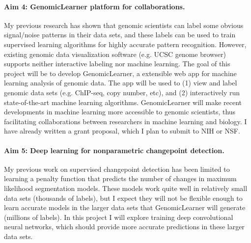 \documentclass{article}
\begin{document}
\paragraph{Aim 4: GenomicLearner platform for collaborations.} My
previous research has shown that genomic scientists can label some
obvious signal/noise patterns in their data sets, and these labels can
be used to train supervised learning algorithms for highly accurate
pattern recognition. However, existing genomic data visualization
software (e.g. UCSC genome browser) supports neither interactive
labeling nor machine learning. The goal of this project will be to
develop GenomicLearner, a extensible web app for machine learning
analysis of genomic data. The app will be used to (1) view and label
genomic data sets (e.g. ChIP-seq, copy number, etc), and (2)
interactively run state-of-the-art machine learning
algorithms. GenomicLearner will make recent developments in machine
learning more accessible to genomic scientists, thus facilitating
collaborations between researchers in machine learning and biology. I
have already written a grant proposal, which I plan to submit to NIH
or NSF.


\paragraph{Aim 5: Deep learning for nonparametric changepoint
  detection.} My previous work on supervised changepoint detection has
been limited to learning a penalty function that predicts the number
of changes in maximum likelihood segmentation models. These models
work quite well in relatively small data sets (thousands of labels),
but I expect they will not be flexible enough to learn accurate models
in the larger data sets that GenomicLearner will generate
(millions of labels). In this project I will explore training deep
convolutional neural networks, which should provide more accurate
predictions in these larger data sets.




\end{document}
